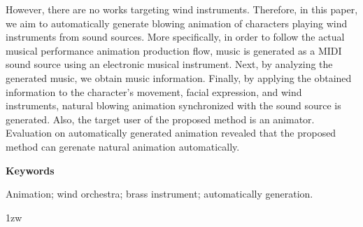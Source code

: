 %
However, there are no works targeting wind instruments.
%
Therefore, in this paper, we aim to automatically generate blowing animation of characters playing wind instruments from sound sources.
%
More specifically, in order to follow the actual musical performance animation production flow, music is generated as a MIDI sound source using an electronic musical instrument.
%
Next, by analyzing the generated music, we obtain music information.
%
%
Finally, by applying the obtained information to the character's movement, facial expression, 
and wind instruments, natural blowing animation synchronized with the sound source is generated.
%
Also, the target user of the proposed method is an animator.\\
\indent
%
Evaluation on automatically generated animation revealed that the proposed method can gerenate natural animation automatically.

\vspace{4ex}

\noindent
{\bf Keywords}

\noindent
Animation; wind orchestra; brass instrument; automatically generation.

\parindent 1zw